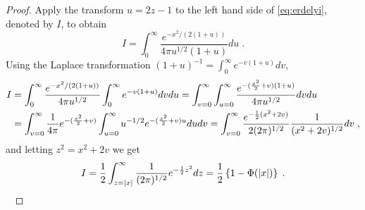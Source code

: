\documentclass[lineno]{biometrika}
\begin{document}
\begin{proof}
  Apply the transform $u = 2z-1$ to the left hand side of \eqref{eq:erdelyi}, denoted by $I$, to obtain 
  \[
  I = \int_{0}^{\infty} \frac{e^{-x^2/(2(1+u))}}{4 \pi {u}^{1/2} (1+u)} du \;.
  \]
  Using the Laplace transformation $(1+u)^{-1} = \int_0^{\infty} e^{-v(1+u)} dv$, 
  \begin{align*}
    I &= \int_{0}^{\infty} \frac{e^{-x^2/(2(1+u))}}{4 \pi {u}^{1/2}} 
    \int_0^{\infty} e^{-v(1+u)} dv du 
    = \int_{v= 0}^{\infty} \int_{u=0}^{\infty} 
    \frac{e^{-(\frac{x^2}{2} + v)(1+u)}}{4 \pi {u}^{1/2}} dv du
    \\
    &= \int_{v= 0}^{\infty} \frac{1}{4\pi} e^{-(\frac{x^2}{2} + v)} 
    \int_{u=0}^{\infty} u^{-1/2} e^{-(\frac{x^2}{2} + v) u} du dv 
    = \int_{v= 0}^{\infty} \frac{e^{-\frac{1}{2}(x^2 + 2v)}}{2 (2\pi)^{1/2}} 
    \frac{1}{(x^2+ 2v)^{1/2} } dv
    \;,
  \end{align*}
  and letting $z^2 = x^2 + 2v$ we get 
  \begin{equation*}
    I = \frac{1}{2} \int_{z = |x|}^{\infty} \frac{1}{(2\pi)^{1/2}} e^{-\frac{1}{2} z^2} dz 
    = \frac{1}{2} \left\{1 - \Phi(|x|)\right\} \;.
  \end{equation*} 
  \ %
\end{proof}


\end{document}

